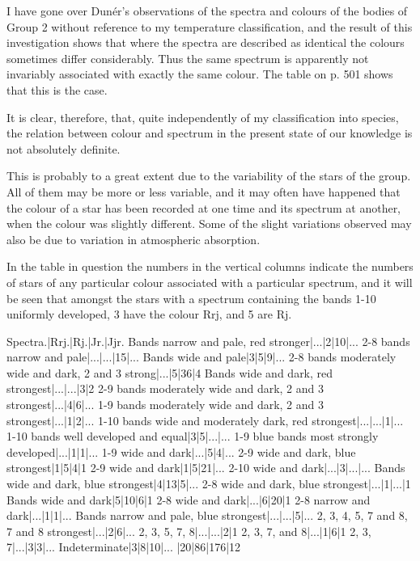 \documentclass[a4paper, 12pt, oneside, polutonikogreek, english]{article}
\begin{document}
I have gone over Dunér's observations of the spectra and colours of the bodies of Group 2 without reference to my temperature classification, and the result of this investigation shows that where the spectra are described as identical the colours sometimes differ considerably. Thus the same spectrum is apparently not invariably associated with exactly the same colour. The table on p. 501 shows that this is the case.

It is clear, therefore, that, quite independently of my classification into species, the relation between colour and spectrum in the present state of our knowledge is not absolutely definite.

This is probably to a great extent due to the variability of the stars of the group. All of them may be more or less variable, and it may often have happened that the colour of a star has been recorded at one time and its spectrum at another, when the colour was slightly different. Some of the slight variations observed may also be due to variation in atmospheric absorption.

In the table in question the numbers in the vertical columns indicate the numbers of stars of any particular colour associated with a particular spectrum, and it will be seen that amongst the stars with a spectrum containing the bands 1-10 uniformly developed, 3 have the colour Rrj, and 5 are Rj.

Spectra.|Rrj.|Rj.|Jr.|Jjr. 
Bands narrow and pale, red stronger|...|2|10|... 
2-8 bands narrow and pale|...|...|15|... 
Bands wide and pale|3|5|9|... 
2-8 bands moderately wide and dark, 2 and 3 strong|...|5|36|4 
Bands wide and dark, red strongest|...|...|3|2 
2-9 bands moderately wide and dark, 2 and 3 strongest|...|4|6|... 
1-9 bands moderately wide and dark, 2 and 3 strongest|...|1|2|... 
1-10 bands wide and moderately dark, red strongest|...|...|1|... 
1-10 bands well developed and equal|3|5|...|... 
1-9 blue bands most strongly developed|...|1|1|... 
1-9 wide and dark|...|5|4|... 
2-9 wide and dark, blue strongest|1|5|4|1 
2-9 wide and dark|1|5|21|... 
2-10 wide and dark|...|3|...|... 
Bands wide and dark, blue strongest|4|13|5|... 
2-8 wide and dark, blue strongest|...|1|...|1 
Bands wide and dark|5|10|6|1 
2-8 wide and dark|...|6|20|1 
2-8 narrow and dark|...|1|1|... 
Bands narrow and pale, blue strongest|...|...|5|... 
2, 3, 4, 5, 7 and 8, 7 and 8 strongest|...|2|6|... 
2, 3, 5, 7, 8|...|...|2|1 
2, 3, 7, and 8|...|1|6|1 
2, 3, 7|...|3|3|... 
Indeterminate|3|8|10|... 
|20|86|176|12 
\end{document}
